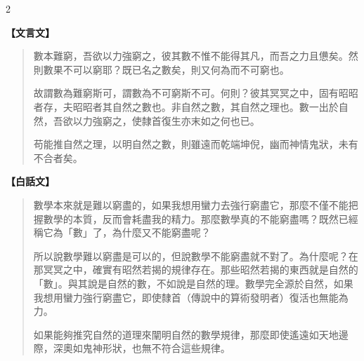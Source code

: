 \documentclass[11pt,a4paper]{article}
\begin{document}
\begin{paracol}{2}
{\color{prefacecolor}
\textbf{【文言文】}

\begin{quote}
數本難窮，吾欲以力強窮之，彼其數不惟不能得其凡，而吾之力且憊矣。然則數果不可以窮耶？既已名之數矣，則又何為而不可窮也。

故謂數為難窮斯可，謂數為不可窮斯不可。何則？彼其冥冥之中，固有昭昭者存，夫昭昭者其自然之數也。非自然之數，其自然之理也。數一出於自然，吾欲以力強窮之，使隸首復生亦末如之何也已。

苟能推自然之理，以明自然之數，則雖遠而乾端坤倪，幽而神情鬼狀，未有不合者矣。
\end{quote}
}

\switchcolumn
{\color{prefacecolor}
\textbf{【白話文】}

\begin{quote}
數學本來就是難以窮盡的，如果我想用蠻力去強行窮盡它，那麼不僅不能把握數學的本質，反而會耗盡我的精力。那麼數學真的不能窮盡嗎？既然已經稱它為「數」了，為什麼又不能窮盡呢？

所以說數學難以窮盡是可以的，但說數學不能窮盡就不對了。為什麼呢？在那冥冥之中，確實有昭然若揭的規律存在。那些昭然若揭的東西就是自然的「數」。與其說是自然的數，不如說是自然的理。數學完全源於自然，如果我想用蠻力強行窮盡它，即使隸首（傳說中的算術發明者）復活也無能為力。

如果能夠推究自然的道理來闡明自然的數學規律，那麼即使遙遠如天地邊際，深奧如鬼神形狀，也無不符合這些規律。
\end{quote}
}
\end{paracol}

\vspace{0.5cm}
\end{document}
